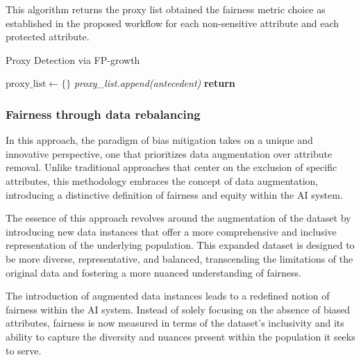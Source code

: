 \documentclass[12pt,a4paper,openright,twoside]{book}
\begin{document}
This algorithm returns the proxy list obtained the fairness metric choice as established in the proposed workflow for each non-sensitive attribute and each protected attribute.

\begin{algorithm}[H]
    \caption{Proxy Detection via FP-growth}
    \label{alg:proxy_detection_fp_growth}
    \begin{algorithmic}[1]
        \State $\text{proxy\_list} \gets \{\}$ 
                    \State \textit{proxy\_list.append(antecedent)}
                \EndIf
            \EndFor
        \EndFor
        \State \textbf{return} 
    \end{algorithmic}
\end{algorithm}

\subsubsection{Fairness through data rebalancing}

In this approach, the paradigm of bias mitigation takes on a unique and innovative perspective, one that prioritizes data augmentation over attribute removal. Unlike traditional approaches that center on the exclusion of specific attributes, this methodology embraces the concept of data augmentation, introducing a distinctive definition of fairness and equity within the AI system.

The essence of this approach revolves around the augmentation of the dataset by introducing new data instances that offer a more comprehensive and inclusive representation of the underlying population. This expanded dataset is designed to be more diverse, representative, and balanced, transcending the limitations of the original data and fostering a more nuanced understanding of fairness. 

The introduction of augmented data instances leads to a redefined notion of fairness within the AI system. Instead of solely focusing on the absence of biased attributes, fairness is now measured in terms of the dataset's inclusivity and its ability to capture the diversity and nuances present within the population it seeks to serve. 
\end{document}
